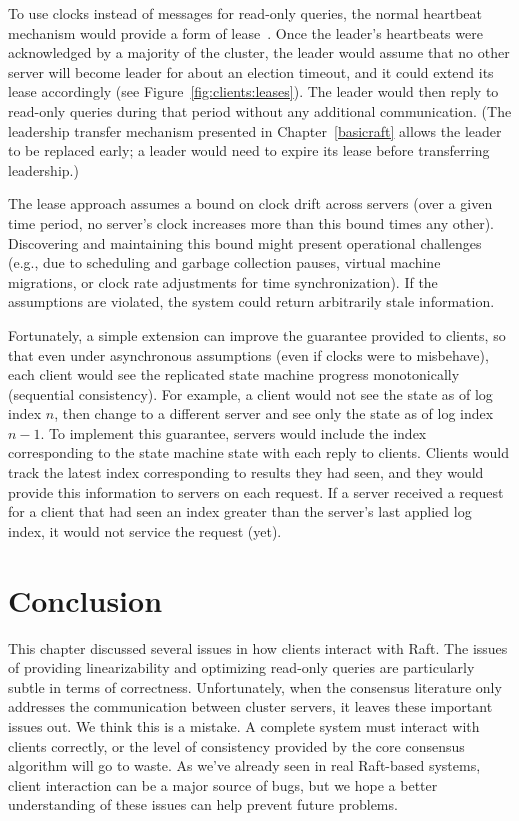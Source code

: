 To use clocks instead of messages for read-only queries,
the normal heartbeat mechanism
would provide a form of lease~\cite{Gray:1989}.
Once the
leader's heartbeats were acknowledged by a majority of the cluster, the
leader would assume that no other server will become leader for about an
election timeout, and it could extend its lease accordingly (see
Figure~\ref{fig:clients:leases}). The leader would then reply to
read-only queries during that period without any additional
communication. (The leadership transfer mechanism presented in
Chapter~\ref{basicraft} allows the leader to be replaced early; a leader
would need to expire its lease before transferring leadership.)

The lease approach assumes a bound on clock drift across servers (over a
given time period, no server's clock increases more than this bound
times any other). Discovering and maintaining this bound might present
operational challenges (e.g., due to scheduling and garbage collection
pauses, virtual machine migrations, or clock rate adjustments for time
synchronization). If the assumptions are violated, the system could
return arbitrarily stale information.

Fortunately, a simple extension can improve the guarantee provided to
clients, so that even under asynchronous assumptions (even if clocks
were to misbehave), each client would see the replicated
state machine progress monotonically (sequential consistency).
For example, a client would not see the state as of log index $n$, then
change to a different server and see only the state as of log index $n-1$.
To implement this guarantee, servers would include the index
corresponding to the state machine state with each reply to clients.
Clients would track the latest index corresponding to results they had
seen, and they would provide this information to servers on each
request. If a server received a request for a client that had seen an
index greater than the server's last applied log index, it would not
service the request (yet).

\section{Conclusion}

This chapter discussed several issues in how clients interact with Raft.
The issues of providing linearizability and optimizing read-only queries
are particularly subtle in terms of correctness. Unfortunately, when the
consensus literature only addresses the communication between cluster
servers, it leaves these important issues out. We think this is a
mistake. A complete system must interact with clients correctly,
or the level of consistency provided by
the core consensus algorithm will go to waste. As we've already seen in
real Raft-based systems, client interaction can be a major source of
bugs, but we hope a better understanding of these issues can help prevent
future problems.

